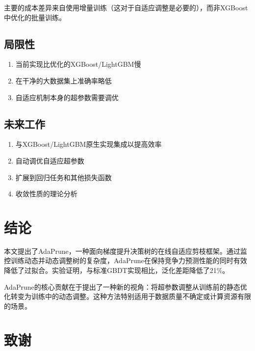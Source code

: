 \documentclass[12pt,a4paper]{article}
\begin{document}
主要的成本差异来自使用增量训练（这对于自适应调整是必要的），而非XGBoost中优化的批量训练。

\subsection{局限性}

\begin{enumerate}[leftmargin=2em]
    \item 当前实现比优化的XGBoost/LightGBM慢
    \item 在干净的大数据集上准确率略低
    \item 自适应机制本身的超参数需要调优
\end{enumerate}

\subsection{未来工作}

\begin{enumerate}[leftmargin=2em]
    \item 与XGBoost/LightGBM原生实现集成以提高效率
    \item 自动调优自适应超参数
    \item 扩展到回归任务和其他损失函数
    \item 收敛性质的理论分析
\end{enumerate}

\section{结论}

本文提出了AdaPrune，一种面向梯度提升决策树的在线自适应剪枝框架。通过监控训练动态并动态调整树的复杂度，AdaPrune在保持竞争力预测性能的同时有效降低了过拟合。实验证明，与标准GBDT实现相比，泛化差距降低了21\%。

AdaPrune的核心贡献在于提出了一种新的视角：将超参数调整从训练前的静态优化转变为训练中的动态调整。这种方法特别适用于数据质量不确定或计算资源有限的场景。

\section*{致谢}
\end{document}
